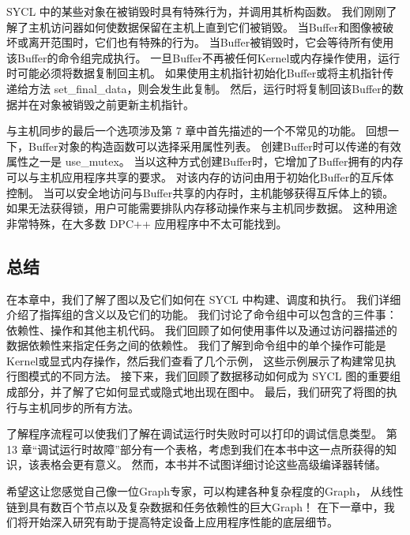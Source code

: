 SYCL 中的某些对象在被销毁时具有特殊行为，并调用其析构函数。 
我们刚刚了解了主机访问器如何使数据保留在主机上直到它们被销毁。 
当Buffer和图像被破坏或离开范围时，它们也有特殊的行为。 
当Buffer被销毁时，它会等待所有使用该Buffer的命令组完成执行。 
一旦Buffer不再被任何Kernel或内存操作使用，运行时可能必须将数据复制回主机。 
如果使用主机指针初始化Buffer或将主机指针传递给方法 set\_final\_data，则会发生此复制。 
然后，运行时将复制回该Buffer的数据并在对象被销毁之前更新主机指针。

与主机同步的最后一个选项涉及第 7 章中首先描述的一个不常见的功能。
回想一下，Buffer对象的构造函数可以选择采用属性列表。 
创建Buffer时可以传递的有效属性之一是 use\_mutex。 
当以这种方式创建Buffer时，它增加了Buffer拥有的内存可以与主机应用程序共享的要求。 
对该内存的访问由用于初始化Buffer的互斥体控制。 
当可以安全地访问与Buffer共享的内存时，主机能够获得互斥体上的锁。 
如果无法获得锁，用户可能需要排队内存移动操作来与主机同步数据。 
这种用途非常特殊，在大多数 DPC++ 应用程序中不太可能找到。

\subsection{总结}
在本章中，我们了解了图以及它们如何在 SYCL 中构建、调度和执行。 
我们详细介绍了指挥组的含义以及它们的功能。 
我们讨论了命令组中可以包含的三件事：依赖性、操作和其他主机代码。 
我们回顾了如何使用事件以及通过访问器描述的数据依赖性来指定任务之间的依赖性。 
我们了解到命令组中的单个操作可能是Kernel或显式内存操作，然后我们查看了几个示例，
这些示例展示了构建常见执行图模式的不同方法。 
接下来，我们回顾了数据移动如何成为 SYCL 图的重要组成部分，并了解了它如何显式或隐式地出现在图中。 
最后，我们研究了将图的执行与主机同步的所有方法。

了解程序流程可以使我们了解在调试运行时失败时可以打印的调试信息类型。 
第 13 章“调试运行时故障”部分有一个表格，考虑到我们在本书中这一点所获得的知识，该表格会更有意义。 
然而，本书并不试图详细讨论这些高级编译器转储。

希望这让您感觉自己像一位Graph专家，可以构建各种复杂程度的Graph，
从线性链到具有数百个节点以及复杂数据和任务依赖性的巨大Graph！ 
在下一章中，我们将开始深入研究有助于提高特定设备上应用程序性能的底层细节。
